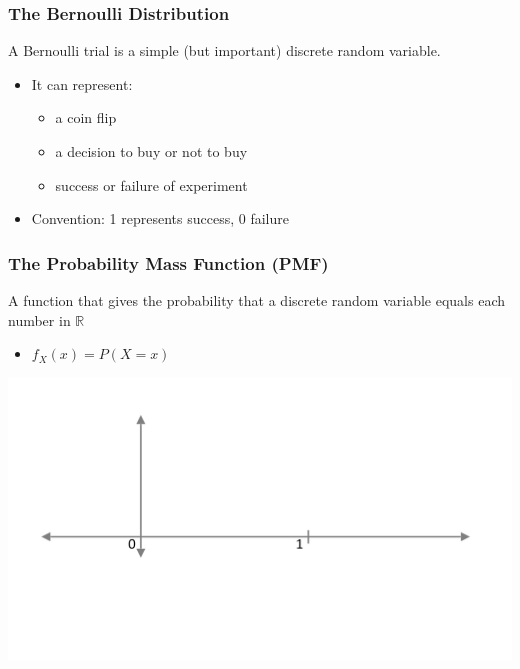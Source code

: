 \documentclass[12pt, block=fill]{beamer}
\newcommand{\R}{\mathbb{R}}
\begin{document}
\begin{frame}[t]
  \frametitle{The Bernoulli Distribution}
   
  A Bernoulli trial is a simple (but important) discrete random
  variable.
  \begin{itemize}
  \item It can represent: 
  \begin{itemize}
\item a coin flip 
\item a decision to buy or not to buy
\item success or
    failure of experiment
\end{itemize}

  \item Convention: 1 represents success, 0 failure
  \end{itemize}
 
   
    
\end{frame}
 
 
  
\begin{frame}[t]
  \frametitle{The Probability Mass Function (PMF)}
   
  A function that gives the probability that a discrete random
  variable equals each number in $\R$

  \begin{itemize}
  \item $f_X(x) = P(X = x)$
  \end{itemize}
  \vspace{.5cm} \includegraphics[width= \textwidth ]{figures/axes}
 
   
\end{frame}
 
\end{document}
